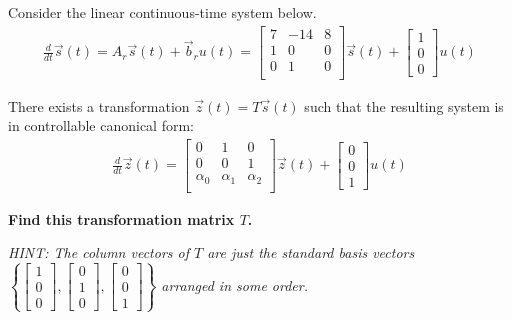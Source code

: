 
Consider the linear continuous-time system below.
\begin{align*}
\frac{d}{dt}\vec{s}(t) 
= A_r\vec{s}(t) + \vec{b}_r {u}(t)
=\begin{bmatrix}
 7 & -14 & 8 \\
 1 & 0 & 0 \\
 0 & 1 & 0\\
\end{bmatrix} 
\vec{s}(t) +
\begin{bmatrix}
1 \\ 0 \\ 0 
\end{bmatrix}
u(t)
\end{align*} 

\begin{enumerate}

\qitem
There exists a transformation $\vec{z}(t) = T\vec{s}(t)$ such that the
resulting system is in controllable canonical form: 
\begin{align*}
\frac{d}{dt}\vec{z}(t) 
= \begin{bmatrix}
 0 & 1 & 0 \\
 0 & 0 & 1 \\
 \alpha_0 & \alpha_1 & \alpha_2 \\
\end{bmatrix} 
\vec{z}(t) +
\begin{bmatrix}
0 \\ 0 \\ 1 
\end{bmatrix}
u(t)
\end{align*}

{\bf Find this transformation matrix $T$.}

{\em HINT:
The column vectors of $T$ are just the standard basis vectors
$\left\{
\begin{bmatrix}
1 \\ 0 \\ 0
\end{bmatrix},
\begin{bmatrix}
0 \\ 1 \\ 0
\end{bmatrix},
\begin{bmatrix}
0 \\ 0 \\ 1
\end{bmatrix}
\right\}
$
arranged in some order.
}


\end{enumerate}
